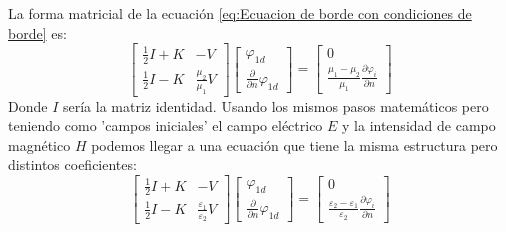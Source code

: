 \documentclass[11pt]{article}
\begin{document}
La forma matricial de la ecuación \eqref{eq:Ecuacion de borde con condiciones de borde} es:
\begin{equation}\label{eq:Forma matricial ecuacion 1}
\begin{bmatrix}
\frac{1}{2}I+K & -V \\ 
\frac{1}{2}I-K & \frac{\mu_2}{\mu_1}V
\end{bmatrix}
\begin{bmatrix}
\varphi_{1d}\\ 
\frac{\partial}{\partial n}\varphi_{1d}
\end{bmatrix}
=\begin{bmatrix}
0\\ 
\frac{\mu_1-\mu_2}{\mu_1}\frac{\partial \varphi_i}{\partial n}
\end{bmatrix}
\end{equation}
Donde $I$ sería la matriz identidad. Usando los mismos pasos matemáticos pero teniendo como 'campos iniciales' el campo eléctrico $E$ y la intensidad de campo magnético $H$ podemos llegar a una ecuación que tiene la misma estructura pero distintos coeficientes:
\begin{equation}
\begin{bmatrix}
\frac{1}{2}I+K & -V \\ 
\frac{1}{2}I-K & \frac{\varepsilon_1}{\varepsilon_2}V
\end{bmatrix}
\begin{bmatrix}
\varphi_{1d}\\ 
\frac{\partial}{\partial n}\varphi_{1d}
\end{bmatrix}
=\begin{bmatrix}
0\\ 
\frac{\varepsilon_2-\varepsilon_1}{\varepsilon_2}\frac{\partial \varphi_i}{\partial n}
\end{bmatrix}
\end{equation}
\end{document}
